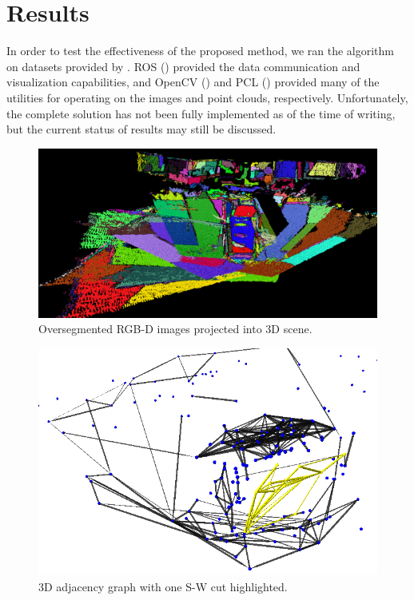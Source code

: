 \documentclass[10pt,letterpaper]{article}
\begin{document}
\section{Results}
	In order to test the effectiveness of the proposed method, we ran the algorithm on datasets provided by \cite{sturm12iros}. ROS (\cite{ros2009}) provided the data communication and visualization capabilities, and OpenCV (\cite{opencv_library}) and PCL (\cite{rusu20113d}) provided many of the utilities for operating on the images and point clouds, respectively. Unfortunately, the complete solution has not been fully implemented as of the time of writing, but the current status of results may still be discussed.

\begin{figure}[ht]
\begin{center}
	\includegraphics[width=.9\linewidth]{OverSegmented1.png}
\end{center}
\caption{Oversegmented RGB-D images projected into 3D scene.}
\label{fig:overseg1}
\end{figure}

\begin{figure}[ht]
\begin{center}
	\includegraphics[width=.9\linewidth]{graph1.png}
\end{center}
\caption{3D adjacency graph with one S-W cut highlighted.}
\label{fig:highGraph}
\end{figure}
\end{document}
